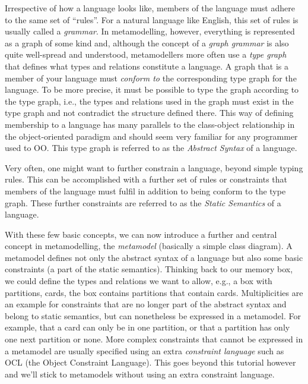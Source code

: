 Irrespective of how a language looks like, members of the language must adhere
to the same set of ``rules''.  
For a natural language like English, this set of rules is usually called a
\emph{grammar}.  
In metamodelling, however, everything is represented as a graph of some kind
and, although the concept of a  \emph{graph grammar} is also quite well-spread
and understood, metamodellers  more often use a \emph{type graph} that defines
what types and relations  constitute a language. 
A graph that is a member of your language must \emph{conform to} the
corresponding type graph for the language.  To be more precise, it must be
possible to type the graph according to the type graph, i.e., the types and
relations used in the graph must exist in the type graph and not contradict the
structure defined there.  
This way of defining membership to a language has many parallels to the
class-object relationship in the object-oriented paradigm and should seem very
familiar for any programmer used to OO.  This type graph is referred to as the
\emph{Abstract Syntax} of a language. 

Very often, one might want to further constrain a language, beyond simple typing
rules.  
This can be accomplished with a further set of rules or constraints that
members of the language must fulfil in addition to being conform to the type
graph.
These further constraints are referred to as the \emph{Static Semantics}
of a language.    

With these few basic concepts, we can now introduce a further and central
concept in metamodelling, the \emph{metamodel} (basically a simple class
diagram). 
A metamodel defines not only the abstract syntax of a language but also some
basic constraints (a part of the static semantics).  
Thinking back to our memory box, we could define the types and relations we want
to allow, e.g.,  a box with partitions, cards, the box contains partitions that
contain cards. 
Multiplicities are an example for constraints that are no longer part of the
abstract syntax and belong to static semantics, but can nonetheless be expressed
in a metamodel.
For example, that a card can only be in one partition, or that a partition has
only one next partition or none.
More complex constraints that cannot be expressed in a metamodel are usually
specified using an extra \emph{constraint language} such as OCL (the Object
Constraint Language).
This goes beyond this tutorial however and we'll stick to metamodels without
using an extra constraint language.              

